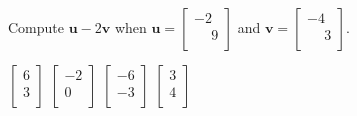 \documentclass[11pt]{exam}
\begin{document}
\begin{questions}
\addpoints
\question[2]
Compute $\mathbf{u}-2\mathbf{v}$ when $\mathbf{u} = \left[\begin{array}{c} -2 \\ \phantom{-}9 \\ \end{array}\right]$ and $\mathbf{v} = \left[\begin{array}{c} -4 \\ \phantom{-}3 \\ \end{array}\right]$.

\begin{oneparchoices}
\choice $\left[\begin{array}{c} 6 \\ 3 \\ \end{array}\right]$ %
\choice $\left[\begin{array}{c} -2 \\ 0 \\ \end{array}\right]$
\choice $\left[\begin{array}{c} -6 \\ -3 \\ \end{array}\right]$
\choice $\left[\begin{array}{c} 3 \\ 4 \\ \end{array}\right]$
\end{oneparchoices}
\answerline


\end{questions}
\end{document}
